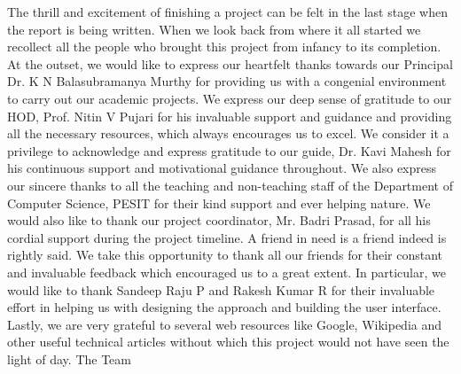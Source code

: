 \documentclass{report}
\begin{document}
\begin{coverpage}
\end{coverpage}

\begin{certificate}
\end{certificate}

\begin{acknowledgement}
The thrill and excitement of finishing a project can be felt in the last stage when the report is being written. When we look back from where it all started we recollect all the people who brought this project from infancy to its completion.
At the outset, we would like to express our heartfelt thanks towards our Principal Dr. K N Balasubramanya Murthy for providing us with a congenial environment to carry out our academic projects.
We express our deep sense of gratitude to our HOD, Prof. Nitin V Pujari for his invaluable support and guidance and providing all the necessary resources, which always encourages us to excel.
We consider it a privilege to acknowledge and express gratitude to our guide, Dr. Kavi Mahesh for his continuous support and motivational guidance throughout.
We also express our sincere thanks to all the teaching and non-teaching staff of the Department of Computer Science, PESIT for their kind support and ever helping nature. We would also like to thank our project coordinator, Mr. Badri Prasad, for all his cordial support during the project timeline.
A friend in need is a friend indeed is rightly said. We take this opportunity to thank all our friends for their constant and invaluable feedback which encouraged us to a great extent. In particular, we would like to thank Sandeep Raju P and Rakesh Kumar R for their invaluable effort in helping us with designing the approach and building the user interface.
Lastly, we are very grateful to several web resources like Google, Wikipedia and other useful technical articles without which this project would not have seen the light of day.
The Team
\end{acknowledgement}
\end{document}
